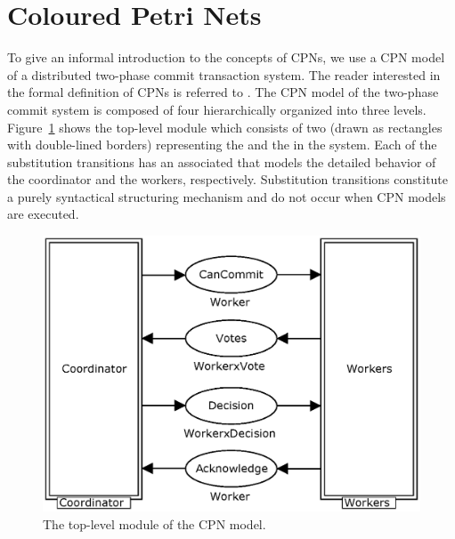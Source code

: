 \section{Coloured Petri Nets}
\label{sect:language}


To give an informal introduction to the concepts of CPNs, we use a CPN
model of a distributed two-phase commit transaction
system. The
reader interested in the formal definition of CPNs is referred to
\cite{newcpnbook}. The CPN model of the two-phase commit system is
composed of four  hierarchically organized into three
levels. Figure~\ref{fig:commit} shows the top-level module which
consists of two  (drawn as
rectangles with double-lined borders) representing the
 and the  in the system. Each of
the substitution transitions has an associated 
that models the detailed behavior of the coordinator and the workers,
respectively. Substitution transitions constitute a purely
syntactical structuring mechanism and do not occur when CPN models are
executed.

\begin{figure}[b]
\centering
\includegraphics[scale=.5]{figures/Commit.eps}
\caption{The top-level module of the CPN model.}
\label{fig:commit}
\end{figure}

